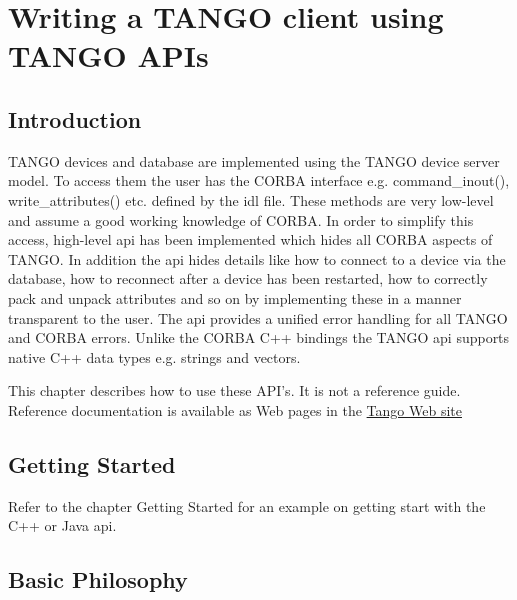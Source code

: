 
\chapter{Writing a TANGO client using TANGO APIs}


\section{Introduction}

\noindent TANGO devices and database are implemented using the TANGO
device server model. To access them the user has the CORBA interface
e.g. command\_inout(), write\_attributes() etc. defined by the idl
file. These methods are very low-level and assume a good working knowledge
of CORBA. In order to simplify this access, high-level api has been
implemented which hides all CORBA aspects of TANGO. In addition the
api hides details like how to connect to a device via the database,
how to reconnect after a device has been restarted, how to correctly
pack and unpack attributes and so on by implementing these in a manner
transparent to the user. The api provides a unified error handling
for all TANGO and CORBA errors. Unlike the CORBA C++ bindings the
TANGO api supports native C++ data types e.g. strings and vectors.

This chapter describes how to use these API's. It is not a reference
guide. Reference documentation is available as Web pages in the \href{http://www.tango-controls.org}{Tango Web site}


\section{\noindent Getting Started}

Refer to the chapter \textquotedbl{}Getting Started\textquotedbl{}
for an example on getting start with the C++ or Java api.


\section{\noindent Basic Philosophy}

